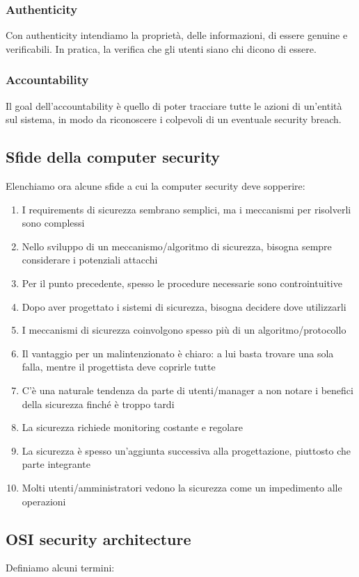 \documentclass[11pt]{article}
\begin{document}
\subsubsection{Authenticity}
Con authenticity intendiamo la proprietà, delle informazioni, di essere genuine e verificabili. In pratica, la verifica che gli utenti siano chi dicono di essere.

\subsubsection{Accountability}
Il goal dell'accountability è quello di poter tracciare tutte le azioni di un'entità sul sistema, in modo da riconoscere i colpevoli di un eventuale security breach. 

\subsection{Sfide della computer security}
Elenchiamo ora alcune sfide a cui la computer security deve sopperire:
\begin{enumerate}
    \item I requirements di sicurezza sembrano semplici, ma i meccanismi per risolverli sono complessi
    \item Nello sviluppo di un meccanismo/algoritmo di sicurezza, bisogna sempre considerare i potenziali attacchi
    \item Per il punto precedente, spesso le procedure necessarie sono controintuitive
    \item Dopo aver progettato i sistemi di sicurezza, bisogna decidere dove utilizzarli
    \item I meccanismi di sicurezza coinvolgono spesso più di un algoritmo/protocollo
    \item Il vantaggio per un malintenzionato è chiaro: a lui basta trovare una sola falla, mentre il progettista deve coprirle tutte
    \item C'è una naturale tendenza da parte di utenti/manager a non notare i benefici della sicurezza finché è troppo tardi 
    \item La sicurezza richiede monitoring costante e regolare
    \item La sicurezza è spesso un'aggiunta successiva alla progettazione, piuttosto che parte integrante
    \item Molti utenti/amministratori vedono la sicurezza come un impedimento alle operazioni
\end{enumerate}
\subsection{OSI security architecture}
Definiamo alcuni termini:
\end{document}

